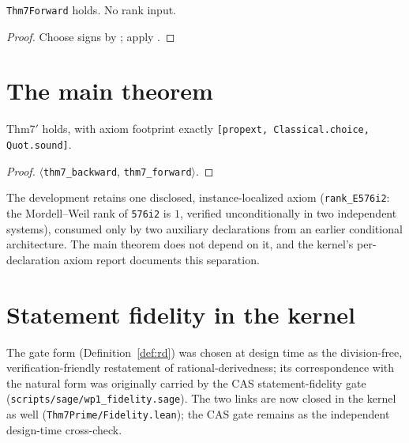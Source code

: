 \begin{theorem}\label{thm:forward}
\leanok
{}
\texttt{Thm7Forward} holds.  No rank input.
\end{theorem}
\begin{proof}\leanok
Choose signs by ; apply .
\end{proof}

\section{The main theorem}

\begin{theorem}\label{thm:main}
\leanok
{}
$\mathrm{Thm7'}$ holds, with axiom footprint exactly
\texttt{[propext, Classical.choice, Quot.sound]}.
\end{theorem}
\begin{proof}\leanok
$\langle$\texttt{thm7\_backward}, \texttt{thm7\_forward}$\rangle$.
\end{proof}

\begin{remark}\label{rem:rank}
The development retains one disclosed, instance-localized axiom
(\texttt{rank\_E576i2}: the Mordell--Weil rank of \texttt{576i2} is $1$,
verified unconditionally in two independent systems), consumed only by
two auxiliary declarations from an earlier conditional architecture.
The main theorem does not depend on it, and the kernel's
per-declaration axiom report documents this separation.
\end{remark}

\section{Statement fidelity in the kernel}

The gate form (Definition~\ref{def:rd}) was chosen at design time as the
division-free, verification-friendly restatement of rational-derivedness; its
correspondence with the natural form was originally carried by the CAS
statement-fidelity gate (\texttt{scripts/sage/wp1\_fidelity.sage}).  The two
links are now closed in the kernel as well
(\texttt{Thm7Prime/Fidelity.lean}); the CAS gate remains as the independent
design-time cross-check.


